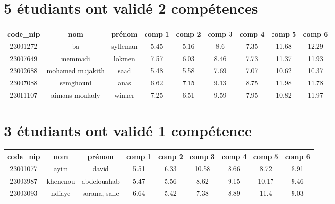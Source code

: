 \documentclass{article}%
\begin{document}
%
\section{5 étudiants ont validé 2 compétences}%
\label{sec:5tudiantsontvalid2comptences}%
\begin{tabular}{|c|c|c|c|c|c|c|c|c|}%
\hline%
code\_nip&nom&prénom&comp 1&comp 2&comp 3&comp 4&comp 5&comp 6\\%
\hline%
23001272&ba&sylleman&5.45&5.16&8.6&7.35&11.68&12.29\\%
\hline%
23007649&memmadi&lokmen&7.57&6.03&8.46&7.73&11.37&11.93\\%
\hline%
23002688&mohamed mujakith&saad&5.48&5.58&7.69&7.07&10.62&10.37\\%
\hline%
23007088&semghouni&anas&6.62&7.15&9.13&8.75&11.98&11.78\\%
\hline%
23011107&aimons moulady&winner&7.25&6.51&9.59&7.95&10.82&11.97\\%
\hline%
\end{tabular}

%
\section{3 étudiants ont validé 1 compétence}%
\label{sec:3tudiantsontvalid1comptence}%
\begin{tabular}{|c|c|c|c|c|c|c|c|c|}%
\hline%
code\_nip&nom&prénom&comp 1&comp 2&comp 3&comp 4&comp 5&comp 6\\%
\hline%
23001077&ayim&david&5.51&6.33&10.58&8.66&8.72&8.91\\%
\hline%
23003987&khenenou&abdelouahab&5.47&5.56&8.62&9.15&10.17&9.46\\%
\hline%
23003093&ndiaye&sorana, salle&6.64&5.42&7.38&8.89&11.4&9.03\\%
\hline%
\end{tabular}

%
\end{document}
